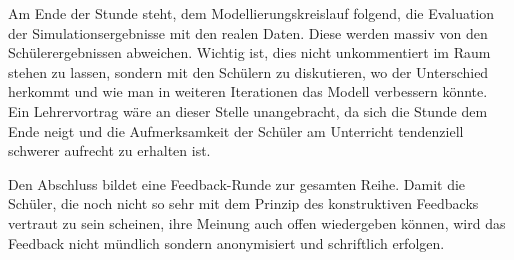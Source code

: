 Am Ende der Stunde steht, dem Modellierungskreislauf folgend, die Evaluation der Simulationsergebnisse mit den realen Daten. Diese werden massiv von den Schülerergebnissen abweichen. Wichtig ist, dies nicht unkommentiert im Raum stehen zu lassen, sondern mit den Schülern zu diskutieren, wo der Unterschied herkommt und wie man in weiteren Iterationen das Modell verbessern könnte. Ein Lehrervortrag wäre an dieser Stelle unangebracht, da sich die Stunde dem Ende neigt und die Aufmerksamkeit der Schüler am Unterricht tendenziell schwerer aufrecht zu erhalten ist. 

Den Abschluss bildet eine Feedback-Runde zur gesamten Reihe. Damit die Schüler, die noch nicht so sehr mit dem Prinzip des konstruktiven Feedbacks vertraut zu sein scheinen, ihre Meinung auch offen wiedergeben können, wird das Feedback nicht mündlich sondern anonymisiert und schriftlich erfolgen. 

